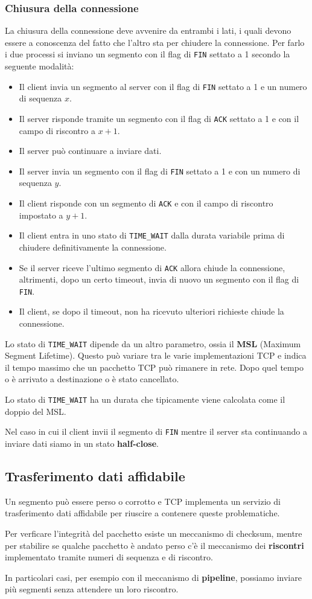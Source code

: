 \subsubsection{Chiusura della connessione}
La chiusura della connessione deve avvenire da entrambi i lati, i quali devono essere a conoscenza
del fatto che l'altro sta per chiudere la connessione. Per farlo i due processi si inviano un
segmento con il flag di \verb|FIN| settato a 1 secondo la seguente modalità:
\begin{itemize}
	\item Il client invia un segmento al server con il flag di \verb|FIN| settato a 1 e un numero
		di sequenza $x$.
	\item Il server risponde tramite un segmento con il flag di \verb|ACK| settato a 1 e con il
		campo di riscontro a $x+1$.
	\item Il server può continuare a inviare dati.
	\item Il server invia un segmento con il flag di \verb|FIN| settato a 1 e con un numero di 
		sequenza $y$.
	\item Il client risponde con un segmento di \verb|ACK| e con il campo di riscontro impostato
		a $y+1$.
	\item Il client entra in uno stato di \verb|TIME_WAIT| dalla durata variabile prima di 
		chiudere definitivamente la connessione.
	\item Se il server riceve l'ultimo segmento di \verb|ACK| allora chiude la connessione, 
		altrimenti, dopo un certo timeout, invia di nuovo un segmento con il flag di \verb|FIN|.
	\item Il client, se dopo il timeout, non ha ricevuto ulteriori richieste chiude la
		connessione.
\end{itemize}
Lo stato di \verb|TIME_WAIT| dipende da un altro parametro, ossia il \textbf{MSL} (Maximum Segment
Lifetime). Questo può variare tra le varie implementazioni TCP e indica il tempo massimo che un
pacchetto TCP può rimanere in rete. Dopo quel tempo o è arrivato a destinazione o è stato 
cancellato.

Lo stato di \verb|TIME_WAIT| ha un durata che tipicamente viene calcolata come il doppio del MSL.

Nel caso in cui il client invii il segmento di \verb|FIN| mentre il server sta continuando a 
inviare dati siamo in un stato \textbf{half-close}.

\subsection{Trasferimento dati affidabile}
Un segmento può essere perso o corrotto e TCP implementa un servizio di trasferimento dati 
affidabile per riuscire a contenere queste problematiche.

Per verficare l'integrità del pacchetto esiste un meccanismo di checksum, mentre per stabilire se
qualche pacchetto è andato perso c'è il meccanismo dei \textbf{riscontri} implementato tramite 
numeri di sequenza e di riscontro.

In particolari casi, per esempio con il meccanismo di \textbf{pipeline}, possiamo inviare più 
segmenti senza attendere un loro riscontro.
